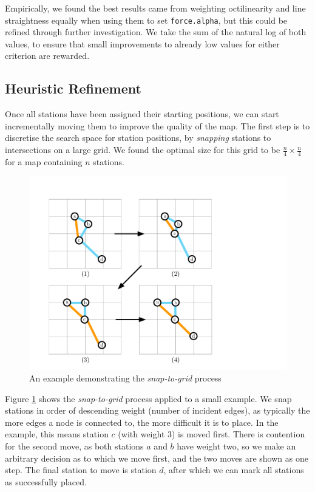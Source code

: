 Empirically, we found the best results came from weighting octilinearity and line straightness equally when using them to set \texttt{force.alpha}, but this could be refined through further investigation. We take the sum of the natural log of both values, to ensure that small improvements to already low values for either criterion are rewarded.

\subsection{Heuristic Refinement}

Once all stations have been assigned their starting positions, we can start incrementally moving them to improve the quality of the map. The first step is to discretise the search space for station positions, by \textit{snapping} stations to intersections on a large grid. We found the optimal size for this grid to be $\frac{n}{4}\times\frac{n}{4}$ for a map containing $n$ stations. 
\begin{figure}[htbp!]
	\centering
	\includegraphics[width=.9\textwidth]{img/implementation/snap.pdf}
	\caption{An example demonstrating the \textit{snap-to-grid} process}
	\label{fig:snap}
\end{figure}

Figure \ref{fig:snap} shows the \textit{snap-to-grid} process applied to a small example. We snap stations in order of descending weight (number of incident edges), as typically the more edges a node is connected to, the more difficult it is to place. In the example, this means station $c$ (with weight 3) is moved first. There is contention for the second move, as both stations $a$ and $b$ have weight two, so we make an arbitrary decision as to which we move first, and the two moves are shown as one step. The final station to move is station $d$, after which we can mark all stations as successfully placed. 

